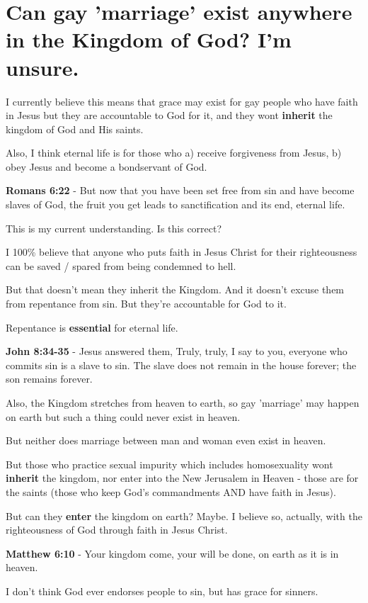 \documentclass[11pt]{article}
\begin{document}
\section{Can gay 'marriage' exist anywhere in the Kingdom of God? I'm unsure.}
\label{sec:orga270ba4}
I currently believe this means that grace may
exist for gay people who have faith in Jesus
but they are accountable to God for it, and
they wont \textbf{inherit} the kingdom of God and His saints.

Also, I think eternal life is for those who a) receive forgiveness from Jesus, b) obey Jesus and become a bondservant of God.

\textbf{Romans 6:22} - But now that you have been set free from sin and have become slaves of God, the fruit you get leads to sanctification and its end, eternal life.

This is my current understanding. Is this correct?

I 100\% believe that anyone who puts faith in Jesus Christ for their righteousness can be saved / spared from being condemned to hell.

But that doesn't mean they inherit the Kingdom.
And it doesn't excuse them from repentance from sin.
But they're accountable for God to it.

Repentance is \textbf{essential} for eternal life.

\textbf{John 8:34-35} - Jesus answered them, Truly, truly, I say to you, everyone who commits sin is a slave to sin. The slave does not remain in the house forever; the son remains forever.

Also, the Kingdom stretches from heaven to earth, so gay 'marriage' may happen on earth but such a thing could never exist in heaven.

But neither does marriage between man and woman even exist in heaven.

But those who practice sexual impurity which includes homosexuality wont \textbf{inherit} the kingdom, nor enter into the New Jerusalem in Heaven - those are for the saints (those who keep God's commandments AND have faith in Jesus).

But can they \textbf{enter} the kingdom on earth? Maybe. I believe so, actually, with the righteousness of God through faith in Jesus Christ.

\textbf{Matthew 6:10} - Your kingdom come, your will be done, on earth as it is in heaven.

I don't think God ever endorses people to sin, but has grace for sinners.
\end{document}
